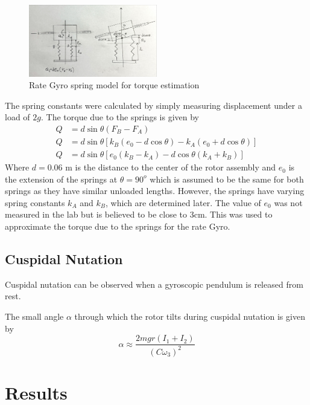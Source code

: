 \documentclass[8pt]{article}
\begin{document}
\begin{figure}
    \centering
    \includegraphics[width=0.5\textwidth]{rate_gyro.jpg}
    \caption{Rate Gyro spring model for torque estimation}
    \label{fig:rate_gyro}
\end{figure}

The spring constants were calculated by simply measuring displacement under a load of $2g$.
The torque due to the springs is given by
\begin{align}
    Q &= d \sin \theta (F_B - F_A) \\
    Q &= d \sin \theta \left[ k_B (e_0 - d \cos \theta) - k_A (e_0 + d \cos \theta) \right] \\
    Q &= d \sin \theta \left[ e_0 (k_B - k_A) - d \cos \theta (k_A + k_B) \right]
\end{align}
Where $d = 0.06$ m is the distance to the center of the rotor assembly and $e_0$ is the extension of the springs at $\theta = 90^o$ which is assumed to be the same for both springs as they have similar unloaded lengths.
However, the springs have varying spring constants $k_A$ and $k_B$, which are determined later.
The value of $e_0$ was not measured in the lab but is believed to be close to 3cm.
This was used to approximate the torque due to the springs for the rate Gyro.

\subsection{Cuspidal Nutation}

Cuspidal nutation can be observed when a gyroscopic pendulum is released from rest.

The small angle $\alpha$ through which the rotor tilts during cuspidal nutation is
given by
\begin{equation}
    \alpha \approx \frac{2mgr(I_1+I_2)}{(C\omega_3)^2} \tag{A8} \label{eq:A8}
\end{equation}


\section{Results}
\end{document}
